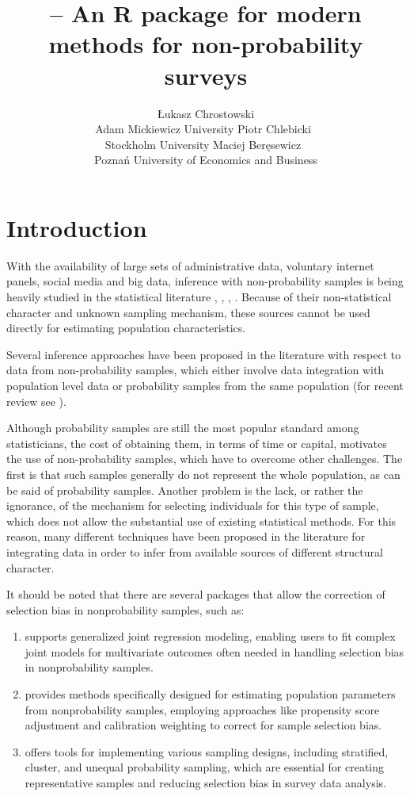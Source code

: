 \documentclass[
]{jss}
\author{
Łukasz Chrostowski\\Adam Mickiewicz University \And Piotr
Chlebicki~\orcidlink{0009-0006-4867-7434}\\Stockholm University
\AND Maciej Beręsewicz~\orcidlink{0000-0002-8281-4301}\\Poznań
University of Economics and Business
}
\title{\pkg{nonprobsvy} -- An R package for modern methods for
non-probability surveys}
\providecommand{\tightlist}{%
  \setlength{\itemsep}{0pt}\setlength{\parskip}{0pt}}
\begin{document}
\hypertarget{introduction}{%
\section{Introduction}\label{introduction}}

With the availability of large sets of administrative data, voluntary
internet panels, social media and big data, inference with
non-probability samples is being heavily studied in the statistical
literature \citet{beaumont2020probability},
\citet{elliott_inference_2017}, \citet{berkesewicz2017two},
\citet{citro2014multiple}. Because of their non-statistical character
and unknown sampling mechanism, these sources cannot be used directly
for estimating population characteristics.

Several inference approaches have been proposed in the literature with
respect to data from non-probability samples, which either involve data
integration with population level data or probability samples from the
same population (for recent review see \citet{wu2022statistical}).

Although probability samples are still the most popular standard among
statisticians, the cost of obtaining them, in terms of time or capital,
motivates the use of non-probability samples, which have to overcome
other challenges. The first is that such samples generally do not
represent the whole population, as can be said of probability samples.
Another problem is the lack, or rather the ignorance, of the mechanism
for selecting individuals for this type of sample, which does not allow
the substantial use of existing statistical methods. For this reason,
many different techniques have been proposed in the literature for
integrating data in order to infer from available sources of different
structural character.

It should be noted that there are several packages that allow the
correction of selection bias in nonprobability samples, such as:

\begin{enumerate}
\def\labelenumi{\arabic{enumi}.}
\tightlist
\item
  \citet{GJRM} supports generalized joint regression modeling, enabling
  users to fit complex joint models for multivariate outcomes often
  needed in handling selection bias in nonprobability samples.
\item
  \citet{NonProbEst} provides methods specifically designed for
  estimating population parameters from nonprobability samples,
  employing approaches like propensity score adjustment and calibration
  weighting to correct for sample selection bias.
\item
  \citet{sampling} offers tools for implementing various sampling
  designs, including stratified, cluster, and unequal probability
  sampling, which are essential for creating representative samples and
  reducing selection bias in survey data analysis.
\end{enumerate}
\end{document}
